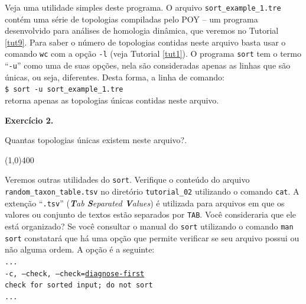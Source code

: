\begin{refsection}
Veja uma utilidade simples deste programa. O arquivo \texttt{sort\_example\_1.tre} contém uma série de topologias compiladas pelo POY \parencite[][]{VaronETAL_2010, VaronETAL_2014} -- um programa desenvolvido para análises de homologia dinâmica, que veremos no Tutorial \ref{tut9}. Para saber o número de topologias contidas neste arquivo basta usar o comando \texttt{wc} com a opção \texttt{-l} (veja Tutorial \ref{tut1}). O programa \texttt{sort} tem o termo ``\texttt{-u}'' como uma de suas opções, nela são consideradas apenas as linhas que são únicas, ou seja, diferentes. Desta forma, a linha de comando:\\

\texttt{\$ sort -u sort\_example\_1.tre}\\

retorna apenas as topologias únicas contidas neste arquivo. \\

\begin{blackBlock}{\textbf{Exercício 2.}}\label{tut2:ex:2.3}

Quantas topologias únicas existem neste arquivo?.

\end{blackBlock}

\begin{center}
\line(1,0){400}\\
\end{center}

\vspace{30pt}


Veremos outras utilidades do \texttt{sort}. Verifique o conteúdo do arquivo \texttt{random\_taxon\_table.tsv} no diretório \texttt{tutorial\_02} utilizando o comando \texttt{cat}. A extenção ``\texttt{.tsv}'' (\textit{\textbf{T}ab \textbf{S}eparated \textbf{V}alues}) é utilizada para arquivos em que os valores ou conjunto de textos estão separados por \texttt{TAB}. Você consideraria que ele está organizado? Se você consultar o manual do \texttt{sort} utilizando o comando \texttt{man sort} constatará que há uma opção que permite verificar se seu arquivo possui ou não alguma ordem. A opção é a seguinte:\\

\noindent\texttt{...}\\
\texttt{-c, --check, --check=\underline{diagnose-first}}\\
\indent\indent\texttt{check for sorted input; do not sort}\\
\texttt{...}\\


\end{refsection}
